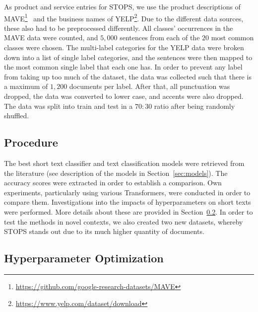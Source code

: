 \documentclass[runningheads]{llncs}
\begin{document}
As product and service entries for STOPS, we use the product descriptions of MAVE\footnote{\url{https://github.com/google-research-datasets/MAVE}}~\cite{yang2022mave} and the business names of YELP\footnote{\url{https://www.yelp.com/dataset/download}}.
Due to the different data sources, these also had to be preprocessed differently.
All classes' occurrences in the MAVE data were counted, and $5,000$ sentences from each of the $20$ most common classes were chosen.
The multi-label categories for the YELP data were broken down into a list of single label categories, and the sentences were then mapped to the most common single label that each one has. In order to prevent any label from taking up too much of the dataset, the data was collected such that there is a maximum of $1,200$ documents per label.
After that, all punctuation was dropped, the data was converted to lower case, and accents were also dropped. The data was split into train and test in a $70:30$ ratio after being randomly shuffled.

\subsection{Procedure}
The best short text classifier and text classification models were retrieved from the literature (see description of the models in Section~\ref{sec:models}).
The accuracy scores were extracted in order to establish a comparison.
Own experiments, particularly using various Transformers, were conducted in order to compare them. Investigations into the impacts of hyperparameters on short texts were performed. More details about these are provided in Section~\ref{sec:hyperparameter}.
In order to test the methods in novel contexts, we also created two new datasets, whereby \ac{STOPS} stands out due to its much higher quantity of documents.

\subsection{Hyperparameter Optimization}
\label{sec:hyperparameter}
\end{document}
